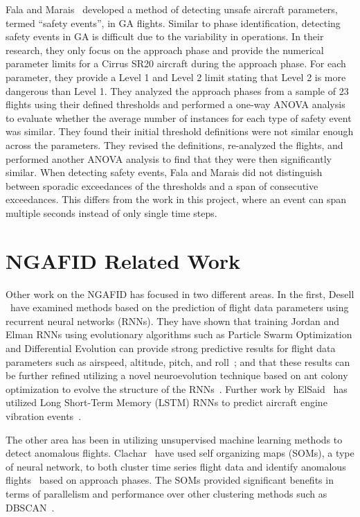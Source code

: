     Fala and Marais~\cite{fala2016detecting} developed a method of detecting unsafe aircraft parameters, termed ``safety events'', in GA flights.  Similar to phase identification, detecting safety events in GA is difficult due to the variability in operations.  In their research, they only focus on the approach phase and provide the numerical parameter limits for a Cirrus SR20 aircraft during the approach phase.  For each parameter, they provide a Level 1 and Level 2 limit stating that Level 2 is more dangerous than Level 1.  They analyzed the approach phases from a sample of 23 flights using their defined thresholds and performed a one-way ANOVA analysis to evaluate whether the average number of instances for each type of safety event was similar.  They found their initial threshold definitions were not similar enough across the parameters.  They revised the definitions, re-analyzed the flights, and performed another ANOVA analysis to find that they were then significantly similar.  When detecting safety events, Fala and Marais did not distinguish between sporadic exceedances of the thresholds and a span of consecutive exceedances.  This differs from the work in this project, where an event can span multiple seconds instead of only single time steps.
	

\section{NGAFID Related Work}

	Other work on the NGAFID has focused in two different areas.  In the first, Desell \etal\ have examined methods based on the prediction of flight data parameters using recurrent neural networks (RNNs).  They have shown that training Jordan and Elman RNNs using evolutionary algorithms such as Particle Swarm Optimization and Differential Evolution can provide strong predictive results for flight data parameters such as airspeed, altitude, pitch, and roll~\cite{desell2014evolving}; and that these results can be further refined utilizing a novel neuroevolution technique based on ant colony optimization to evolve the structure of the RNNs~\cite{desell2015evolving}. Further work by ElSaid \etal\ has utilized Long Short-Term Memory (LSTM) RNNs to predict aircraft engine vibration events~\cite{elsaid2016vibration,elsaid2016thesis}. 
    
    The other area has been in utilizing unsupervised machine learning methods to detect anomalous flights.  Clachar \etal\ have used self organizing maps (SOMs), a type of neural network, to both cluster time series flight data and identify anomalous flights~\cite{sophine2014identifying,sophine2016phd} based on approach phases. The SOMs provided significant benefits in terms of parallelism and performance over other clustering methods such as DBSCAN~\cite{ester1996a-density-based}.


